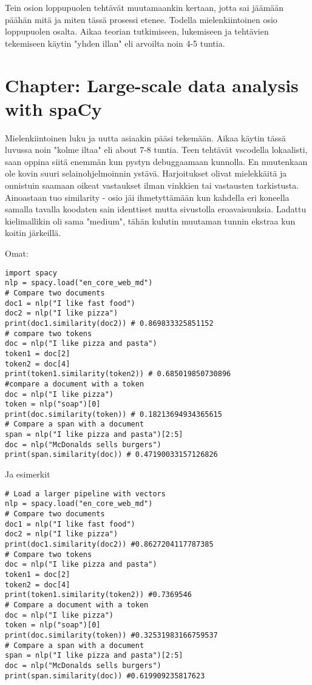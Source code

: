 \documentclass{article}
\begin{document}
Tein osion loppupuolen tehtävät muutamaankin kertaan, jotta sai jäämään päähän mitä ja miten tässä prosessi etenee. Todella mielenkiintoinen osio loppupuolen osalta. Aikaa teorian tutkimiseen, lukemiseen ja tehtävien tekemiseen käytin "yhden illan"  eli arvoilta noin 4-5 tuntia.

\section{Chapter: Large-scale data analysis with spaCy}



Mielenkiintoinen luku ja uutta asiaakin pääsi tekemään. Aikaa käytin tässä luvussa noin "kolme iltaa" eli about 7-8 tuntia.
 Teen tehtävät vscodella lokaalisti, saan oppina siitä enemmän kun pystyn debuggaamaan kunnolla. En muutenkaan ole kovin suuri selainohjelmoinnin ystävä. Harjoitukset olivat mielekkäitä ja onnistuin saamaan oikeat vastaukset ilman vinkkien tai vastausten tarkistusta. Ainoastaan tuo similarity - osio jäi ihmetyttämään kun kahdella eri koneella samalla tavalla koodaten sain identtiset mutta sivustolla eroavaisuuksia. Ladattu kielimallikin oli sama "medium", tähän kulutin muutaman tunnin ekstraa kun koitin järkeillä.

Omat:
\begin{lstlisting}
import spacy
nlp = spacy.load("en_core_web_md")
# Compare two documents
doc1 = nlp("I like fast food")
doc2 = nlp("I like pizza")
print(doc1.similarity(doc2)) # 0.869833325851152
# compare two tokens
doc = nlp("I like pizza and pasta")
token1 = doc[2]
token2 = doc[4]
print(token1.similarity(token2)) # 0.685019850730896
#compare a document with a token
doc = nlp("I like pizza")
token = nlp("soap")[0]
print(doc.similarity(token)) # 0.18213694934365615
# Compare a span with a document
span = nlp("I like pizza and pasta")[2:5]
doc = nlp("McDonalds sells burgers")
print(span.similarity(doc)) # 0.47190033157126826
\end{lstlisting}

Ja esimerkit
\begin{lstlisting}
# Load a larger pipeline with vectors
nlp = spacy.load("en_core_web_md")
# Compare two documents
doc1 = nlp("I like fast food")
doc2 = nlp("I like pizza")
print(doc1.similarity(doc2)) #0.8627204117787385
# Compare two tokens
doc = nlp("I like pizza and pasta")
token1 = doc[2]
token2 = doc[4]
print(token1.similarity(token2)) #0.7369546
# Compare a document with a token
doc = nlp("I like pizza")
token = nlp("soap")[0]
print(doc.similarity(token)) #0.32531983166759537
# Compare a span with a document
span = nlp("I like pizza and pasta")[2:5]
doc = nlp("McDonalds sells burgers")
print(span.similarity(doc)) #0.619909235817623
\end{lstlisting}
\end{document}
